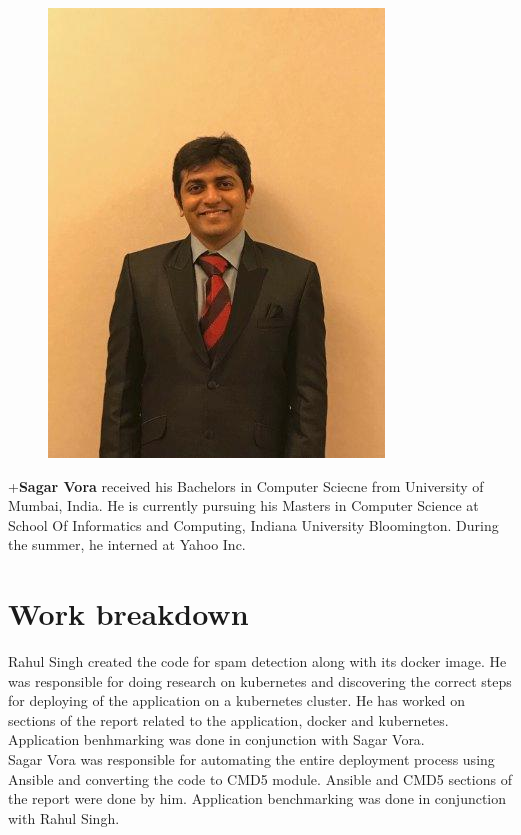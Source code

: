 \documentclass[9pt,twocolumn,twoside]{../../styles/osajnl}
\begin{document}
\noindent
\begingroup
\setlength\intextsep{0pt}
\begin{minipage}[t][3.2cm][t]{1.0\columnwidth} %
  \begin{figure}
    \includegraphics[width=0.25\columnwidth]{images/sagar_vora.jpg}
  \end{figure}
  \noindent
+{\bfseries Sagar Vora} received his Bachelors in Computer Sciecne
from University of Mumbai, India. He is currently pursuing his Masters
in Computer Science at School Of Informatics and Computing, Indiana
University Bloomington. During the summer, he interned at Yahoo Inc.

\end{minipage}
\endgroup

\section{Work breakdown}
Rahul Singh created the code for spam detection along with its docker
image. He was responsible for doing research on kubernetes and
discovering the correct steps for deploying of the application on a
kubernetes cluster. He has worked on sections of the report related to
the application, docker and kubernetes. Application benhmarking was
done in conjunction with Sagar Vora.\\

\noindent
Sagar Vora was responsible for automating the entire deployment
process using Ansible and converting the code to CMD5 module. Ansible
and CMD5 sections of the report were done by him. Application
benchmarking was done in conjunction with Rahul Singh.
\end{document}
